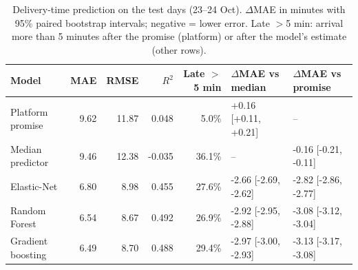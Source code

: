 \begin{table}[t]
\centering
\caption{Delivery-time prediction on the test days (23--24 Oct). $\Delta$MAE in minutes with 95\% paired bootstrap intervals; negative = lower error. Late $>$5 min: arrival more than 5 minutes after the promise (platform) or after the model's estimate (other rows).}
\label{tab:main_results}
\begin{tabular}{lrrrrll}
\toprule
Model & MAE & RMSE & $R^2$ & Late $>$5 min & $\Delta$MAE vs median & $\Delta$MAE vs promise \\
\midrule
Platform promise & 9.62 & 11.87 & 0.048 & 5.0\% & +0.16 [+0.11, +0.21] & -- \\
Median predictor & 9.46 & 12.38 & -0.035 & 36.1\% & -- & -0.16 [-0.21, -0.11] \\
Elastic-Net & 6.80 & 8.98 & 0.455 & 27.6\% & -2.66 [-2.69, -2.62] & -2.82 [-2.86, -2.77] \\
Random Forest & 6.54 & 8.67 & 0.492 & 26.9\% & -2.92 [-2.95, -2.88] & -3.08 [-3.12, -3.04] \\
Gradient boosting & 6.49 & 8.70 & 0.488 & 29.4\% & -2.97 [-3.00, -2.93] & -3.13 [-3.17, -3.08] \\
\bottomrule
\end{tabular}
\end{table}
